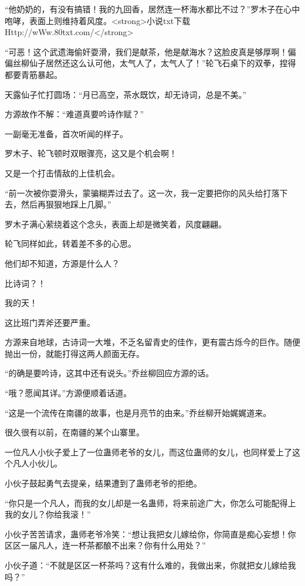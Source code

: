 
\begin{this_body}

“他奶奶的，有没有搞错！我的九回香，居然连一杯海水都比不过？”罗木子在心中咆哮，表面上则维持着风度。<strong>小说txt下载Http://wWw.80txt.com/</strong>

“可恶！这个武遗海偷奸耍滑，我们是献茶，他是献海水？这脸皮真是够厚啊！偏偏丝柳仙子居然还这么认可他，太气人了，太气人了！”轮飞石桌下的双拳，捏得都要青筋暴起。

天露仙子忙打圆场：“月已高空，茶水既饮，却无诗词，总是不美。”

方源故作不解：“难道真要吟诗作赋？”

一副毫无准备，首次听闻的样子。

罗木子、轮飞顿时双眼骤亮，这又是个机会啊！

又是一个打击情敌的上佳机会。

“前一次被你耍滑头，蒙骗糊弄过去了。这一次，我一定要把你的风头给打落下去，然后再狠狠地踩上几脚。”

罗木子满心萦绕着这个念头，表面上却是微笑着，风度翩翩。

轮飞同样如此，转着差不多的心思。

他们却不知道，方源是什么人？

比诗词？！

我的天！

这比班门弄斧还要严重。

方源来自地球，古诗词一大堆，不乏名留青史的佳作，更有震古烁今的巨作。随便抛出一份，就能打得这两人颜面无存。

“的确是要吟诗，这其中还有说头。”乔丝柳回应方源的话。

“哦？愿闻其详。”方源便顺着话道。

“这是一个流传在南疆的故事，也是月亮节的由来。”乔丝柳开始娓娓道来。

很久很有以前，在南疆的某个山寨里。

一位凡人小伙子爱上了一位蛊师老爷的女儿，而这位蛊师的女儿，也同样爱上了这个凡人小伙儿。

小伙子鼓起勇气去提亲，结果遭到了蛊师老爷的拒绝。

“你只是一个凡人，而我的女儿却是一名蛊师，将来前途广大，你怎么可能配得上我的女儿？你给我滚！”

小伙子苦苦请求，蛊师老爷冷笑：“想让我把女儿嫁给你，你简直是痴心妄想！你区区一届凡人，连一杯茶都酿不出来？你有什么用处？”

小伙子道：“不就是区区一杯茶吗？这有什么难的，我做出来，你就把女儿嫁给我吗？”


\end{this_body}
